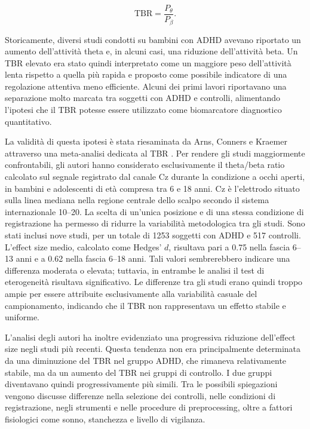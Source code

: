 \begin{equation}
	\mathrm{TBR} =
	\frac{P_{\theta}}{P_{\beta}}.
\end{equation}

Storicamente, diversi studi condotti su bambini con ADHD avevano
riportato un aumento dell'attività theta e, in alcuni casi, una
riduzione dell'attività beta. Un TBR elevato era stato quindi
interpretato come un maggiore peso dell'attività lenta rispetto a
quella più rapida e proposto come possibile indicatore di una
regolazione attentiva meno efficiente. Alcuni dei primi lavori
riportavano una separazione molto marcata tra soggetti con ADHD e
controlli, alimentando l'ipotesi che il TBR potesse essere utilizzato
come biomarcatore diagnostico quantitativo.

La validità di questa ipotesi è stata riesaminata da Arns, Conners e
Kraemer attraverso una meta-analisi dedicata al TBR
\cite{Arns2013}. Per rendere gli studi maggiormente confrontabili, gli autori hanno
considerato esclusivamente il theta/beta ratio calcolato sul segnale
registrato dal canale Cz durante la condizione a occhi aperti, in
bambini e adolescenti di età compresa tra 6 e 18 anni. Cz è
l'elettrodo situato sulla linea mediana nella regione centrale dello
scalpo secondo il sistema internazionale 10--20. La scelta di un'unica
posizione e di una stessa condizione di registrazione ha permesso di
ridurre la variabilità metodologica tra gli studi. Sono stati
inclusi nove studi, per un totale di 1253 soggetti con ADHD e 517
controlli. L'effect size medio, calcolato come Hedges' \(d\), risultava
pari a 0.75 nella fascia 6--13 anni e a 0.62 nella fascia 6--18 anni.
Tali valori sembrerebbero indicare una differenza moderata o elevata;
tuttavia, in entrambe le analisi il test di eterogeneità risultava
significativo. Le differenze tra gli studi erano quindi troppo ampie
per essere attribuite esclusivamente alla variabilità casuale del
campionamento, indicando che il TBR non rappresentava un effetto
stabile e uniforme.

L'analisi degli autori ha inoltre evidenziato una progressiva
riduzione dell'effect size negli studi più recenti. Questa tendenza
non era principalmente determinata da una diminuzione del TBR nel
gruppo ADHD, che rimaneva relativamente stabile, ma da un aumento del
TBR nei gruppi di controllo. I due gruppi diventavano quindi
progressivamente più simili. Tra le possibili spiegazioni vengono
discusse differenze nella selezione dei controlli, nelle condizioni di
registrazione, negli strumenti e nelle procedure di preprocessing,
oltre a fattori fisiologici come sonno, stanchezza e livello di
vigilanza.

